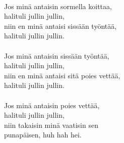 \hspace{10mm} \\
            Jos minä antaisin sormella koittaa, \\
            halituli jullin jullin, \\
            niin en minä antaisi sissään työntää, \\
            halituli jullin jullin. \\
\hspace{10mm} \\
            Jos minä antaisin sissään työntää, \\
            halituli jullin jullin, \\
            niin en minä antaisi sitä poies vettää, \\
            halituli jullin jullin. \\
\hspace{10mm} \\
            Jos minä antaisin poies vettää, \\
            halituli jullin jullin, \\
            niin takaisin minä vaatisin sen \\
            punapäisen, huh hah hei. \\
